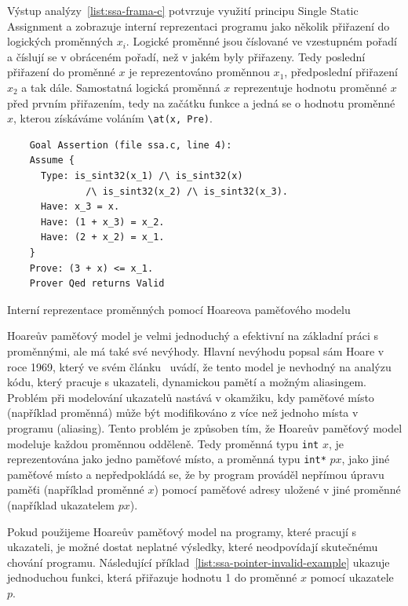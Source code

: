 Výstup analýzy~\ref{list:ssa-frama-c} potvrzuje využití principu Single Static Assignment
a zobrazuje interní reprezentaci programu jako několik přiřazení do logických proměnných $x_i$.
Logické proměnné jsou číslované ve vzestupném pořadí a číslují se v obráceném pořadí, než v jakém byly přiřazeny.
Tedy poslední přiřazení do proměnné $x$ je reprezentováno proměnnou $x_1$, předposlední přiřazení $x_2$ a tak dále.
Samostatná logická proměnná $x$ reprezentuje hodnotu proměnné $x$ před prvním přiřazením,
tedy na začátku funkce a jedná se o hodnotu proměnné $x$, kterou získáváme voláním \texttt{\textbackslash at(x, Pre)}.

\begin{listing}[H]
    \begin{verbatim}
    Goal Assertion (file ssa.c, line 4):
    Assume {
      Type: is_sint32(x_1) /\ is_sint32(x)
              /\ is_sint32(x_2) /\ is_sint32(x_3).
      Have: x_3 = x.
      Have: (1 + x_3) = x_2.
      Have: (2 + x_2) = x_1.
    }
    Prove: (3 + x) <= x_1.
    Prover Qed returns Valid
    \end{verbatim}
    \caption{Interní reprezentace proměnných pomocí Hoareova paměťového modelu}
    \label{list:ssa-frama-c}
\end{listing}


Hoareův paměťový model je velmi jednoduchý a efektivní na základní práci s proměnnými, ale má také své nevýhody.
Hlavní nevýhodu popsal sám Hoare v roce 1969, který ve svém článku~\cite{Hoare1969} uvádí,
že tento model je nevhodný na analýzu kódu, který pracuje s ukazateli, dynamickou pamětí a možným aliasingem.
Problém při modelování ukazatelů nastává v okamžiku,
kdy paměťové místo (například proměnná) může být modifikováno z více než jednoho místa v programu (aliasing).
Tento problém je způsoben tím, že Hoareův paměťový model modeluje každou proměnnou odděleně.
Tedy proměnná typu \texttt{int} $x$, je reprezentována jako jedno paměťové místo,
a proměnná typu \texttt{int*} $px$, jako jiné paměťové místo a nepředpokládá se,
že by program prováděl nepřímou úpravu paměťi (například proměnné $x$) pomocí paměťové adresy
uložené v jiné proměnné (například ukazatelem $px$).

Pokud použijeme Hoareův paměťový model na programy, které pracují s ukazateli,
je možné dostat neplatné výsledky, které neodpovídají skutečnému chování programu.
Následující příklad~\ref{list:ssa-pointer-invalid-example} ukazuje jednoduchou funkci,
která přiřazuje hodnotu 1 do proměnné $x$ pomocí ukazatele $p$.


